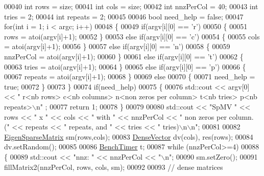 \begin{DoxyCode}
00040   \textcolor{keywordtype}{int} rows = size;
00041   \textcolor{keywordtype}{int} cols = size;
00042   \textcolor{keywordtype}{int} nnzPerCol = 40;
00043   \textcolor{keywordtype}{int} tries = 2;
00044   \textcolor{keywordtype}{int} repeats = 2;
00045 
00046   \textcolor{keywordtype}{bool} need\_help = \textcolor{keyword}{false};
00047   \textcolor{keywordflow}{for}(\textcolor{keywordtype}{int} i = 1; i < argc; i++)
00048   \{
00049     \textcolor{keywordflow}{if}(argv[i][0] == \textcolor{charliteral}{'r'})
00050     \{
00051       rows = atoi(argv[i]+1);
00052     \}
00053     \textcolor{keywordflow}{else} \textcolor{keywordflow}{if}(argv[i][0] == \textcolor{charliteral}{'c'})
00054     \{
00055       cols = atoi(argv[i]+1);
00056     \}
00057     \textcolor{keywordflow}{else} \textcolor{keywordflow}{if}(argv[i][0] == \textcolor{charliteral}{'n'})
00058     \{
00059       nnzPerCol = atoi(argv[i]+1);
00060     \}
00061     \textcolor{keywordflow}{else} \textcolor{keywordflow}{if}(argv[i][0] == \textcolor{charliteral}{'t'})
00062     \{
00063       tries = atoi(argv[i]+1);
00064     \}
00065     \textcolor{keywordflow}{else} \textcolor{keywordflow}{if}(argv[i][0] == \textcolor{charliteral}{'p'})
00066     \{
00067       repeats = atoi(argv[i]+1);
00068     \}
00069     \textcolor{keywordflow}{else}
00070     \{
00071       need\_help = \textcolor{keyword}{true};
00072     \}
00073   \}
00074   \textcolor{keywordflow}{if}(need\_help)
00075   \{
00076     std::cout << argv[0] << \textcolor{stringliteral}{" r<nb rows> c<nb columns> n<non zeros per column> t<nb tries> p<nb repeats>\(\backslash\)n"}
      ;
00077     \textcolor{keywordflow}{return} 1;
00078   \}
00079 
00080   std::cout << \textcolor{stringliteral}{"SpMV "} << rows << \textcolor{stringliteral}{" x "} << cols << \textcolor{stringliteral}{" with "} << nnzPerCol << \textcolor{stringliteral}{" non zeros per column. ("} << 
      repeats << \textcolor{stringliteral}{" repeats, and "} << tries << \textcolor{stringliteral}{" tries)\(\backslash\)n\(\backslash\)n"};
00081 
00082   \hyperlink{group___sparse_core___module}{EigenSparseMatrix} sm(rows,cols);
00083   \hyperlink{group___core___module}{DenseVector} dv(cols), res(rows);
00084   dv.setRandom();
00085 
00086   \hyperlink{class_eigen_1_1_bench_timer}{BenchTimer} t;
00087   \textcolor{keywordflow}{while} (nnzPerCol>=4)
00088   \{
00089     std::cout << \textcolor{stringliteral}{"nnz: "} << nnzPerCol << \textcolor{stringliteral}{"\(\backslash\)n"};
00090     sm.setZero();
00091     fillMatrix2(nnzPerCol, rows, cols, sm);
00092 
00093     \textcolor{comment}{// dense matrices}

\end{DoxyCode}
